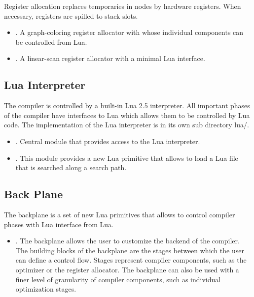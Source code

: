 \documentclass{article}%
\begin{document}
Register allocation replaces temporaries in {\cfg} nodes by hardware
registers. When necessary, registers are spilled to stack slots.

\begin{itemize}

\item {}. A graph-coloring register allocator
with whose individual components can be controlled from Lua.

\item {}. A linear-scan register allocator with a
minimal Lua interface.

\end{itemize}

\subsection{Lua Interpreter}

The compiler is controlled by a built-in Lua 2.5 interpreter. All
important phases of the compiler have interfaces to Lua which allows
them to be controlled by Lua code. The implementation of the Lua
interpreter is in its own sub directory {\Tt{}lua/\nwendquote}.

\begin{itemize}

\item {}. Central module that provides access to the
Lua interpreter.

\item {}. This module provides a new Lua primitive
that allows to load a Lua file that is searched along a search path.

\end{itemize}

\subsection{Back Plane}

The backplane is a set of new Lua primitives that allows to control
compiler phases with Lua interface from Lua.

\begin{itemize}

\item {}. The backplane allows the user to
customize the backend of the compiler. The building blocks of the
backplane are the stages between which the user can define a control
flow. Stages represent compiler components, such as the optimizer or the
register allocator. The backplane can also be used with a finer level of
granularity of compiler components, such as individual optimization
stages.

\end{itemize}
\end{document}
